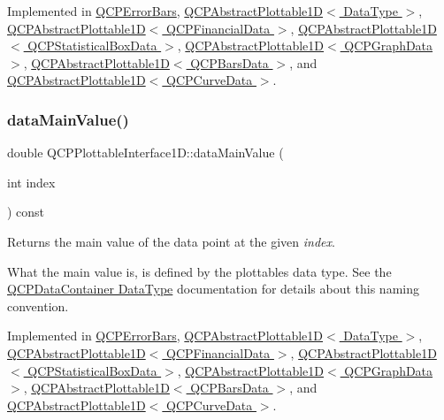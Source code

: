 Implemented in \hyperlink{classQCPErrorBars_a7cba420078adc523efa59fb8c6ca23e0}{Q\+C\+P\+Error\+Bars}, \hyperlink{classQCPAbstractPlottable1D_aeb156ebf5d3c8de906b428be30733ad8}{Q\+C\+P\+Abstract\+Plottable1\+D$<$ Data\+Type $>$}, \hyperlink{classQCPAbstractPlottable1D_aeb156ebf5d3c8de906b428be30733ad8}{Q\+C\+P\+Abstract\+Plottable1\+D$<$ Q\+C\+P\+Financial\+Data $>$}, \hyperlink{classQCPAbstractPlottable1D_aeb156ebf5d3c8de906b428be30733ad8}{Q\+C\+P\+Abstract\+Plottable1\+D$<$ Q\+C\+P\+Statistical\+Box\+Data $>$}, \hyperlink{classQCPAbstractPlottable1D_aeb156ebf5d3c8de906b428be30733ad8}{Q\+C\+P\+Abstract\+Plottable1\+D$<$ Q\+C\+P\+Graph\+Data $>$}, \hyperlink{classQCPAbstractPlottable1D_aeb156ebf5d3c8de906b428be30733ad8}{Q\+C\+P\+Abstract\+Plottable1\+D$<$ Q\+C\+P\+Bars\+Data $>$}, and \hyperlink{classQCPAbstractPlottable1D_aeb156ebf5d3c8de906b428be30733ad8}{Q\+C\+P\+Abstract\+Plottable1\+D$<$ Q\+C\+P\+Curve\+Data $>$}.

\mbox{\label{classQCPPlottableInterface1D_af6330919e8023277d08c958a6074fc76}} 
\subsubsection{\texorpdfstring{data\+Main\+Value()}{dataMainValue()}}
{\footnotesize\ttfamily double Q\+C\+P\+Plottable\+Interface1\+D\+::data\+Main\+Value (\begin{DoxyParamCaption}\item[{int}]{index }\end{DoxyParamCaption}) const\hspace{0.3cm}{\ttfamily [pure virtual]}}

Returns the main value of the data point at the given {\itshape index}.

What the main value is, is defined by the plottable\textquotesingle{}s data type. See the \hyperlink{classQCPDataContainer_qcpdatacontainer-datatype}{Q\+C\+P\+Data\+Container Data\+Type} documentation for details about this naming convention. 

Implemented in \hyperlink{classQCPErrorBars_ae9f6c79c03147efb1a67742c55386dc8}{Q\+C\+P\+Error\+Bars}, \hyperlink{classQCPAbstractPlottable1D_a6be0f657ba85a1688336d76ad649ecf2}{Q\+C\+P\+Abstract\+Plottable1\+D$<$ Data\+Type $>$}, \hyperlink{classQCPAbstractPlottable1D_a6be0f657ba85a1688336d76ad649ecf2}{Q\+C\+P\+Abstract\+Plottable1\+D$<$ Q\+C\+P\+Financial\+Data $>$}, \hyperlink{classQCPAbstractPlottable1D_a6be0f657ba85a1688336d76ad649ecf2}{Q\+C\+P\+Abstract\+Plottable1\+D$<$ Q\+C\+P\+Statistical\+Box\+Data $>$}, \hyperlink{classQCPAbstractPlottable1D_a6be0f657ba85a1688336d76ad649ecf2}{Q\+C\+P\+Abstract\+Plottable1\+D$<$ Q\+C\+P\+Graph\+Data $>$}, \hyperlink{classQCPAbstractPlottable1D_a6be0f657ba85a1688336d76ad649ecf2}{Q\+C\+P\+Abstract\+Plottable1\+D$<$ Q\+C\+P\+Bars\+Data $>$}, and \hyperlink{classQCPAbstractPlottable1D_a6be0f657ba85a1688336d76ad649ecf2}{Q\+C\+P\+Abstract\+Plottable1\+D$<$ Q\+C\+P\+Curve\+Data $>$}.

